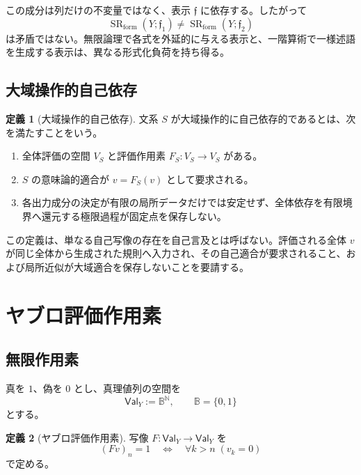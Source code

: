 \documentclass[a4paper,11pt]{ltjsarticle}
\theoremstyle{definition}
\newtheorem{definition}{定義}[section]
\theoremstyle{plain}
\newcommand{\Val}{\mathsf{Val}}
\newcommand{\SR}{\operatorname{SR}}
\newcommand{\Bool}{\mathbb B}
\newcommand{\N}{\mathbb N}
\begin{document}
この成分は列だけの不変量ではなく、表示 $\mathfrak f$ に依存する。したがって
\begin{equation}
 \SR_{\mathrm{form}}(Y;\mathfrak f_1)
 \neq
 \SR_{\mathrm{form}}(Y;\mathfrak f_2)
\end{equation}
は矛盾ではない。無限論理で各式を外延的に与える表示と、一階算術で一様述語を生成する表示は、異なる形式化負荷を持ち得る。

\subsection{大域操作的自己依存}

\begin{definition}[大域操作的自己依存]
文系 $S$ が大域操作的に自己依存的であるとは、次を満たすことをいう。
\begin{enumerate}
 \item 全体評価の空間 $V_S$ と評価作用素 $F_S:V_S\to V_S$ がある。
 \item $S$ の意味論的適合が $v=F_S(v)$ として要求される。
 \item 各出力成分の決定が有限の局所データだけでは安定せず、全体依存を有限境界へ還元する極限過程が固定点を保存しない。
\end{enumerate}
\end{definition}

この定義は、単なる自己写像の存在を自己言及とは呼ばない。評価される全体 $v$ が同じ全体から生成された規則へ入力され、その自己適合が要求されること、および局所近似が大域適合を保存しないことを要請する。

\section{ヤブロ評価作用素}

\subsection{無限作用素}

真を $1$、偽を $0$ とし、真理値列の空間を
\begin{equation}
 \Val_Y:=\Bool^{\N},
 \qquad \Bool=\{0,1\}
\end{equation}
とする。

\begin{definition}[ヤブロ評価作用素]
写像 $F:\Val_Y\to\Val_Y$ を
\begin{equation}
 (Fv)_n=1
 \quad\Longleftrightarrow\quad
 \forall k>n\;(v_k=0)
 \label{eq:yablo-operator}
\end{equation}
で定める。
\end{definition}
\end{document}
